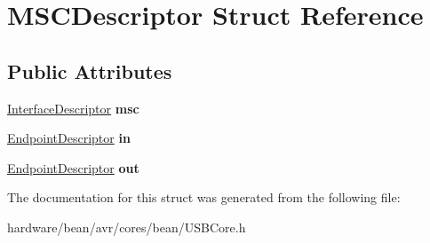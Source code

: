 \hypertarget{struct_m_s_c_descriptor}{}\section{M\+S\+C\+Descriptor Struct Reference}
\label{struct_m_s_c_descriptor}
\subsection*{Public Attributes}
\begin{DoxyCompactItemize}
\item 
\hypertarget{struct_m_s_c_descriptor_ad1df90234c1714bd3ffa34c0a28d4621}{}\hyperlink{struct_interface_descriptor}{Interface\+Descriptor} {\bfseries msc}\label{struct_m_s_c_descriptor_ad1df90234c1714bd3ffa34c0a28d4621}

\item 
\hypertarget{struct_m_s_c_descriptor_a9ae4c4c01f7b1f9ed6c16bbd8793dfd9}{}\hyperlink{struct_endpoint_descriptor}{Endpoint\+Descriptor} {\bfseries in}\label{struct_m_s_c_descriptor_a9ae4c4c01f7b1f9ed6c16bbd8793dfd9}

\item 
\hypertarget{struct_m_s_c_descriptor_a2e9b0bbe81b8b510cd182c70560c33eb}{}\hyperlink{struct_endpoint_descriptor}{Endpoint\+Descriptor} {\bfseries out}\label{struct_m_s_c_descriptor_a2e9b0bbe81b8b510cd182c70560c33eb}

\end{DoxyCompactItemize}


The documentation for this struct was generated from the following file\+:\begin{DoxyCompactItemize}
\item 
hardware/bean/avr/cores/bean/U\+S\+B\+Core.\+h\end{DoxyCompactItemize}
